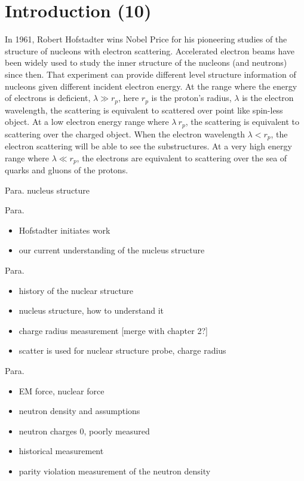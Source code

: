 \chapter{Introduction (10)}

In 1961, Robert Hofstadter wins Nobel Price for his pioneering studies of the structure of nucleons with electron scattering. Accelerated electron beams have been widely used to study the inner structure of the nucleons (and neutrons) since then. That experiment can provide different level structure information of nucleons given different incident electron energy. At the range where the energy of electrons is deficient, $\lambda \gg r_p$, here $r_p$ is the proton's radius, $\lambda$ is the electron wavelength, the scattering is equivalent to scattered over point like spin-less object. At a low electron energy range where $\lambda ~r_p$, the scattering is equivalent to scattering over the charged object. When the electron wavelength $\lambda < r_p$, the electron scattering will be able to see the substructures. At a very high energy range where $\lambda \ll r_p$, the electrons are equivalent to scattering over the sea of quarks and gluons of the protons. 

Para. nucleus structure

Para. 
\begin{itemize}
    \item Hofstadter initiates work
    \item our current understanding of the nucleus structure
\end{itemize}

Para.

\begin{itemize}
\item history of the nuclear structure
    \item nucleus structure, how to understand it
    \item charge radius measurement [merge with chapter 2?]
    \item scatter is used for nuclear structure probe, charge radius 
\end{itemize}


Para. 

\begin{itemize}
    \item EM force, nuclear force
    \item neutron density and assumptions
\end{itemize}


\begin{itemize}
    \item neutron charges 0, poorly measured
    \item historical measurement 
    \item parity violation measurement of the neutron density
\end{itemize} 

